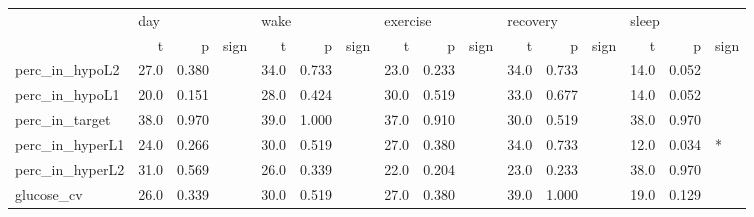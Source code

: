 \begin{tabular}{lrrlrrlrrlrrlrrl}
\toprule
{} & \multicolumn{3}{l}{day} & \multicolumn{3}{l}{wake} & \multicolumn{3}{l}{exercise} & \multicolumn{3}{l}{recovery} & \multicolumn{3}{l}{sleep} \\
{} &     t &      p & sign &     t &      p & sign &        t &      p & sign &        t &      p & sign &     t &      p & sign \\
\midrule
perc_in_hypoL2  &  27.0 &  0.380 &      &  34.0 &  0.733 &      &     23.0 &  0.233 &      &     34.0 &  0.733 &      &  14.0 &  0.052 &      \\
perc_in_hypoL1  &  20.0 &  0.151 &      &  28.0 &  0.424 &      &     30.0 &  0.519 &      &     33.0 &  0.677 &      &  14.0 &  0.052 &      \\
perc_in_target  &  38.0 &  0.970 &      &  39.0 &  1.000 &      &     37.0 &  0.910 &      &     30.0 &  0.519 &      &  38.0 &  0.970 &      \\
perc_in_hyperL1 &  24.0 &  0.266 &      &  30.0 &  0.519 &      &     27.0 &  0.380 &      &     34.0 &  0.733 &      &  12.0 &  0.034 &    * \\
perc_in_hyperL2 &  31.0 &  0.569 &      &  26.0 &  0.339 &      &     22.0 &  0.204 &      &     23.0 &  0.233 &      &  38.0 &  0.970 &      \\
glucose_cv      &  26.0 &  0.339 &      &  30.0 &  0.519 &      &     27.0 &  0.380 &      &     39.0 &  1.000 &      &  19.0 &  0.129 &      \\
\bottomrule
\end{tabular}
